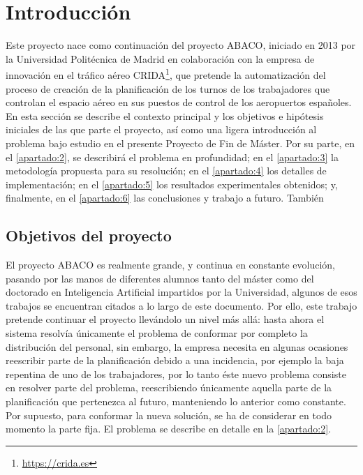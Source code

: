 \graphicspath{{capitulos/Capitulo1-Introduccion/recursos/}}


\section{Introducción}

Este proyecto nace como continuación del proyecto ABACO, iniciado en 2013 por la Universidad Politécnica de Madrid en
colaboración con la empresa de innovación en el tráfico aéreo CRIDA\footnote{\url{https://crida.es}}, que pretende la
automatización del proceso de creación de la planificación de los turnos de los trabajadores que controlan el espacio 
aéreo en sus puestos de control de los aeropuertos españoles.
\\

En esta sección se describe el contexto principal y los objetivos e hipótesis iniciales de las que parte el proyecto, 
así como una ligera introducción al problema bajo estudio en el presente Proyecto de Fin de Máster. Por su parte, en el 
\autoref{apartado:2}, se describirá el problema en profundidad; en el \autoref{apartado:3}
la metodología propuesta para su resolución; en el \autoref{apartado:4} los detalles de implementación;
en el \autoref{apartado:5} los resultados experimentales obtenidos; y, finalmente, en el \autoref{apartado:6} las 
conclusiones y trabajo a futuro. También  %

\subsection{Objetivos del proyecto}
\label{sec:Objectivos}
El proyecto \gls{ABACO} es realmente grande, y continua en constante evolución, pasando por las manos de 
diferentes alumnos tanto del máster como del doctorado en Inteligencia Artificial impartidos por la Universidad, algunos de esos trabajos se encuentran citados a lo largo de este documento. 
Por ello, este trabajo pretende continuar el proyecto llevándolo un nivel más allá: hasta ahora el sistema resolvía únicamente el problema de conformar por completo la distribución del personal, sin embargo, la empresa necesita en algunas ocasiones reescribir parte de la planificación debido a una incidencia, por ejemplo la baja repentina de uno de los trabajadores, por lo tanto éste nuevo problema consiste en resolver parte del problema, reescribiendo únicamente aquella parte de la planificación que pertenezca al futuro, manteniendo lo anterior como constante. 
Por supuesto, para conformar la nueva solución, se ha de considerar en todo momento la parte fija. El problema se describe en detalle en la \autoref{apartado:2}.
\\

